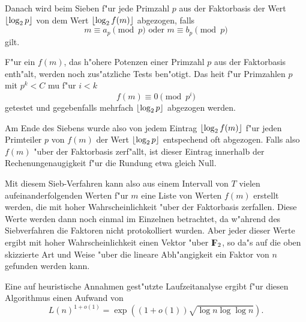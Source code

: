 Danach wird beim Sieben f"ur jede Primzahl $p$ aus der Faktorbasis der
Wert $\lfloor \log_2 p \rfloor$ von dem Wert $\lfloor \log_2 f(m) \rfloor$ abgezogen,
falls
$$ m \equiv a_p \pmod{p} \mbox{ oder } m \equiv b_p \pmod{p} $$
gilt.

F"ur ein $f(m)$, das h"ohere Potenzen einer Primzahl $p$ aus der
Faktorbasis enth"alt, werden noch zus"atzliche Tests ben"otigt. Das
hei\3t f"ur Primzahlen $p$ mit $p^k<C$ mu\3 f"ur $i<k$
$$ f(m) \equiv 0 \pmod{p^i} $$
getestet und gegebenfalls mehrfach $\lfloor \log_2 p \rfloor$ abgezogen werden. 

Am Ende des Siebens wurde also von jedem Eintrag $\lfloor \log_2 f(m) \rfloor$
f"ur jeden Primteiler $p$ von $f(m)$ der Wert $\lfloor \log_2 p \rfloor$
entspechend oft abgezogen.  Falls also $f(m)$ "uber der Faktorbasis
zerf"allt, ist dieser Eintrag innerhalb der Rechenungenaugigkeit f"ur
die Rundung etwa gleich Null.

Mit diesem Sieb-Verfahren kann also aus einem Intervall von $T$ vielen
aufeinanderfolgenden Werten f"ur $m$ eine Liste von Werten $f(m)$
erstellt werden, die mit hoher Wahrscheinlichkeit "uber der
Faktorbasis zerfallen. Diese Werte werden dann noch einmal im
Einzelnen betrachtet, da w"ahrend des Siebverfahren die Faktoren nicht
protokolliert wurden. Aber jeder dieser Werte ergibt mit hoher 
Wahrscheinlichkeit einen Vektor "uber $\F_2$, so da"s
auf die oben skizzierte Art und Weise "uber die lineare
Abh"angigkeit ein Faktor von $n$ gefunden werden kann.

Eine auf heuristische Annahmen gest"utzte Laufzeitanalyse ergibt f"ur
diesen Algorithmus einen Aufwand von
$$ L(n)^{1+o(1)} = \exp\left( (1+o(1))\sqrt{\log n\log\log n} \right) .$$


   
   
      

      
      
    
    

    

    

